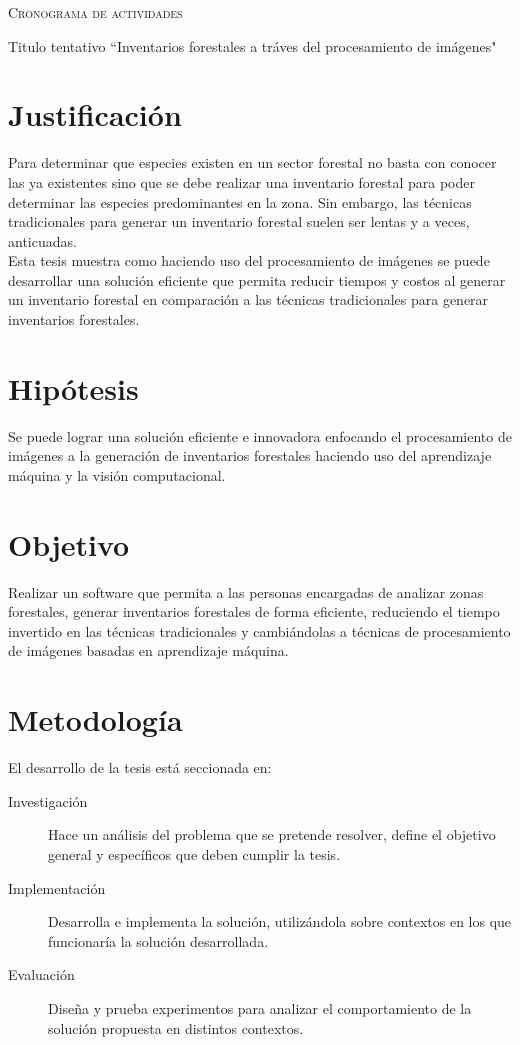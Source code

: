 \documentclass{article}
\begin{document}
\begin{center} {\scshape\LARGE Cronograma de actividades \par} \end{center}
Titulo tentativo   ``Inventarios forestales a tráves del procesamiento de imágenes"

\section*{Justificación}
Para determinar que especies existen en un sector forestal no basta con conocer las ya existentes sino que se debe realizar una inventario forestal para poder determinar las especies predominantes en la zona. Sin embargo, las técnicas tradicionales para generar un inventario forestal suelen ser lentas y a veces, anticuadas.\newline\\
Esta tesis muestra como haciendo uso del procesamiento de imágenes se puede desarrollar una solución eficiente que permita reducir tiempos y costos al generar un inventario forestal en comparación a las técnicas tradicionales para generar inventarios forestales.

\section*{Hipótesis}
Se puede lograr una solución eficiente e innovadora enfocando el procesamiento de imágenes a la generación de inventarios forestales haciendo uso del aprendizaje máquina y la visión computacional.

\section*{Objetivo}
Realizar un software que permita a las personas encargadas de analizar zonas forestales, generar inventarios forestales de forma eficiente, reduciendo el tiempo invertido en las técnicas tradicionales y cambiándolas a técnicas de procesamiento de imágenes basadas en aprendizaje máquina.

\section*{Metodología}
El desarrollo de la tesis está seccionada en:

\begin{description}
\item[Investigación]{Hace un análisis del problema que se pretende resolver, define el objetivo general y específicos que deben cumplir la tesis.}

\item[Implementación]{Desarrolla e implementa la solución, utilizándola sobre contextos en los que funcionaría la solución desarrollada. }

\item[Evaluación]{Diseña y prueba experimentos para analizar el comportamiento de la solución propuesta en distintos contextos.}

\end{description}
\end{document}
